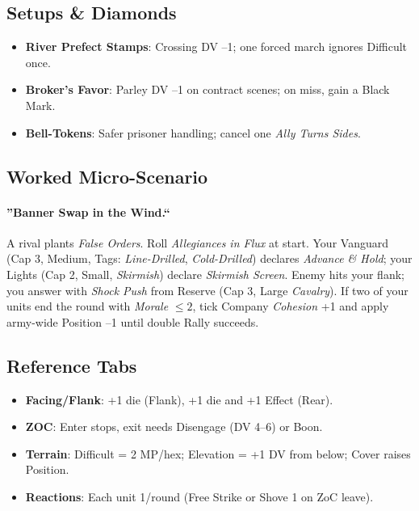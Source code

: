 \documentclass[11pt]{article}
\begin{document}
\subsection{Setups \& Diamonds}
\begin{itemize}[leftmargin=*]
  \item \textbf{River Prefect Stamps}: Crossing DV --1; one forced march ignores Difficult once.
  \item \textbf{Broker's Favor}: Parley DV --1 on contract scenes; on miss, gain a Black Mark.
  \item \textbf{Bell-Tokens}: Safer prisoner handling; cancel one \emph{Ally Turns Sides}.
\end{itemize}

\subsection{Worked Micro-Scenario}
\paragraph{''Banner Swap in the Wind.``} A rival plants \emph{False Orders}. Roll \emph{Allegiances in Flux} at start. Your Vanguard (Cap 3, Medium, Tags: \emph{Line-Drilled}, \emph{Cold-Drilled}) declares \emph{Advance \& Hold}; your Lights (Cap 2, Small, \emph{Skirmish}) declare \emph{Skirmish Screen}. Enemy hits your flank; you answer with \emph{Shock Push} from Reserve (Cap 3, Large \emph{Cavalry}). If two of your units end the round with \emph{Morale} $\le 2$, tick Company \emph{Cohesion} +1 and apply army-wide Position --1 until double Rally succeeds.

\subsection{Reference Tabs}
\begin{itemize}[leftmargin=*]
  \item \textbf{Facing/Flank}: +1 die (Flank), +1 die and +1 Effect (Rear).
  \item \textbf{ZOC}: Enter stops, exit needs Disengage (DV 4--6) or Boon.
  \item \textbf{Terrain}: Difficult = 2 MP/hex; Elevation = +1 DV from below; Cover raises Position.
  \item \textbf{Reactions}: Each unit 1/round (Free Strike or Shove 1 on ZoC leave).
\end{itemize}
\end{document}
